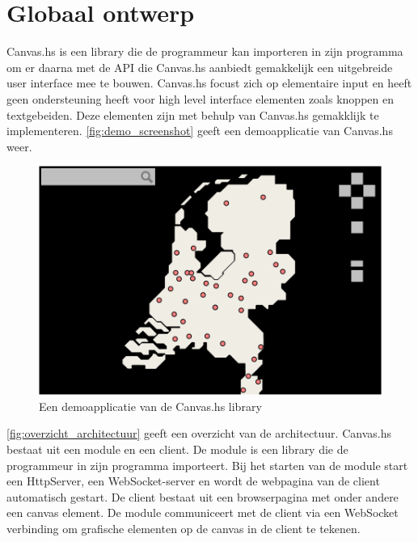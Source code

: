 \section{Globaal ontwerp}  \label{sec:globaal}
Canvas.hs is een library die de programmeur kan importeren in zijn programma om er daarna met de API die Canvas.hs aanbiedt gemakkelijk een uitgebreide user interface mee te bouwen. Canvas.hs focust zich op elementaire input en heeft geen ondersteuning heeft voor high level interface elementen zoals knoppen en textgebeiden. Deze elementen zijn met behulp van Canvas.hs gemakklijk te implementeren. \autoref{fig:demo_screenshot} geeft een demoapplicatie van Canvas.hs weer.



\begin{figure}[H]
\begin{center}
\includegraphics[keepaspectratio,width=\textwidth]{./images/demo.png}
\caption{Een demoapplicatie van de Canvas.hs library}
\label{fig:demo_screenshot}
\end{center}
\end{figure}


\autoref{fig:overzicht_architectuur} geeft een overzicht van de architectuur. Canvas.hs bestaat uit een module en een client. De module is een library die de programmeur in zijn programma importeert. Bij het starten van de module start een HttpServer, een WebSocket-server en wordt de webpagina van de client automatisch gestart. De client bestaat uit een browserpagina met onder andere een canvas element. De module communiceert met de client via een WebSocket verbinding om grafische elementen op de canvas in de client te tekenen.

